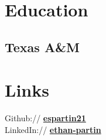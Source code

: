 \documentclass[letterpaper]{deedy-resume} %
\begin{document}
\begin{minipage}[t]{0.33\textwidth} %


\section{Education} 

\subsection{Texas A\&M}


\sectionspace %


\section{Links} 

Github:// \href{https://github.com/espartin21}{\bf espartin21} \\
LinkedIn:// \href{www.linkedin.com/in/ethan-partin}{\bf ethan-partin} \\\\
\sectionspace %




\end{minipage}
\end{document}
